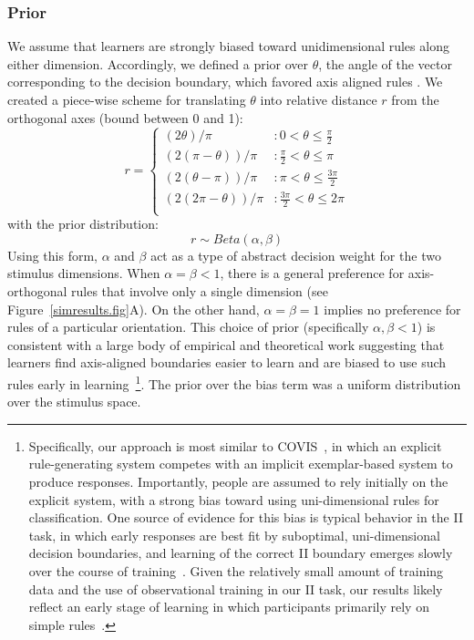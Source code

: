 \documentclass[3p,twocolumn,authoryear,10pt]{elsarticle}
\begin{document}
\subsubsection{Prior}
We assume that learners are strongly biased toward unidimensional rules along either dimension.  Accordingly, we defined a prior over $\theta$, the angle of the vector corresponding to the decision boundary, which favored axis aligned rules \citep[cf.][]{Heller:2009fk}.  We created a piece-wise scheme for translating $\theta$ into relative distance $r$ from the orthogonal axes (bound between 0 and 1):
\begin{equation}
   r= \left\{
     \begin{array}{ll}
       (2 \theta)/\pi & : 0 < \theta \le \frac{\pi}{2}\\
       (2 (\pi-\theta))/\pi  & : \frac{\pi}{2} < \theta \le \pi\\
       (2 (\theta-\pi))/\pi  & : \pi < \theta \le \frac{3\pi}{2}\\
       (2 (2\pi-\theta))/\pi  & : \frac{3\pi}{2} < \theta \le 2\pi\\
     \end{array}
   \right.
   \label{priorcode.eq}
\end{equation} 
with the prior distribution: 
\begin{equation}
r \sim Beta(\alpha,\beta)
\end{equation}
Using this form, $\alpha$ and $\beta$ act as a type of abstract decision weight for the two stimulus dimensions. When $\alpha=\beta < 1$, there is a general preference for axis-orthogonal rules that involve only a single dimension (see Figure~\ref{simresults.fig}A). On the other hand, $\alpha=\beta=1$ implies no preference for rules of a particular orientation.  This choice of prior (specifically $\alpha,\beta<1$) is consistent with a large body of empirical and theoretical work suggesting that learners find axis-aligned boundaries easier to learn and are biased to use such rules early in learning~\citep{Ashby:1998p8468,Ashby:1999ig,Ashby:2002p13331}\footnote{Specifically, our approach is most similar to COVIS~\citep{Ashby:1998p8468}, in which an explicit rule-generating system competes with an 
implicit exemplar-based system to produce responses. Importantly, people are assumed to rely 
initially on the explicit system, with a strong bias toward using uni-dimensional rules for classification. 
One source of evidence for this bias is typical behavior in the II task, in which early responses are best 
fit by suboptimal, uni-dimensional decision boundaries, and learning of the correct II boundary emerges 
slowly over the course of training~\citep{maddox2004dissociating}. Given the relatively small amount of training data and the use of observational training in our II task, our results likely reflect an early stage of learning in which participants primarily rely on simple rules~\citep{Ashby:2002p13331}.}. The prior over the bias term was a uniform distribution over the stimulus space.  \\
\end{document}
